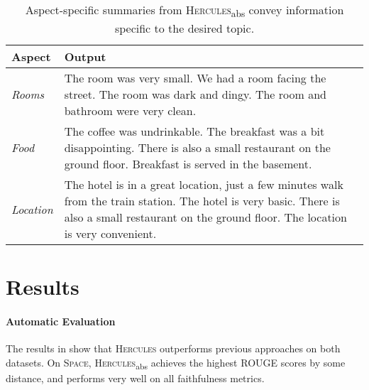 \documentclass[11pt]{article}
\begin{document}
\begin{table*}[ht]
\renewcommand{\arraystretch}{1.2}
    \centering
    \small
    \begin{tabular}{@{}m{2cm}@{~}|@{~}m{13.5cm}@{}}
    \textbf{Aspect} & \textbf{Output} \\
    \hline\hline
    \textit{Rooms} & The room was very small. We had a room facing the street. The room was dark and dingy. The room and bathroom were very clean. \\
    \hline
\textit{Food} & The coffee was undrinkable. The breakfast was a bit disappointing. There is also a small restaurant on the ground floor. Breakfast is served in the basement. \\
\hline
\textit{Location} & The hotel is in a great location, just a few minutes walk from the train station. The hotel is very basic. There is also a small restaurant on the ground floor. The location is very convenient. \\
    \end{tabular}
\caption{Aspect-specific summaries from \textsc{Hercules}\textsubscript{abs} convey information specific to the desired topic.}
    \vspace*{-.2cm}
    \label{tab:aspectoutput}
\end{table*}




\section{Results}
\label{sec:results}


\paragraph{Automatic Evaluation}

The results in  show that \textsc{Hercules} outperforms previous approaches on both datasets. On \textsc{Space}, \textsc{Hercules}\textsubscript{abs} achieves the highest ROUGE scores by some distance, and performs very well on all faithfulness metrics. 
\end{document}
